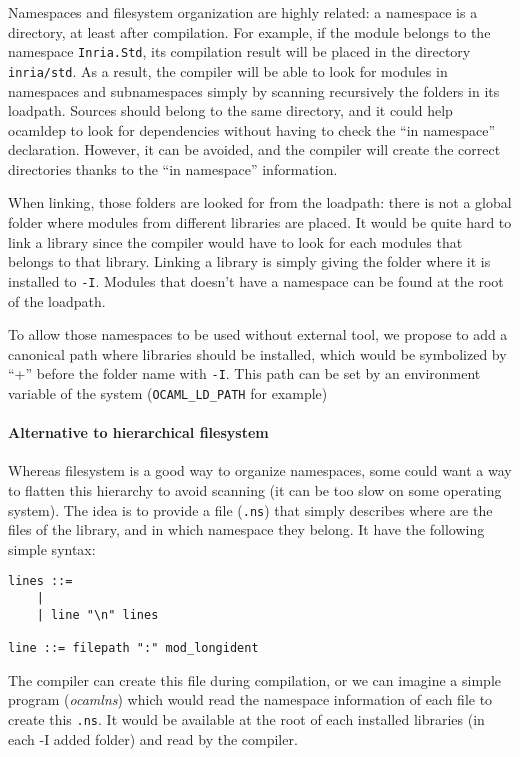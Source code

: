 \documentclass[11pt,a4paper]{article}
\begin{document}
Namespaces and filesystem organization are highly related: a namespace is a
directory, at least after compilation. For example, if the module belongs to the
namespace \texttt{Inria.Std}, its compilation result will be placed in the
directory \texttt{inria/std}. As a result, the compiler will be able to look for
modules in namespaces and subnamespaces simply by scanning recursively the
folders in its loadpath. Sources should belong to the same directory, and it
could help ocamldep to look for dependencies without having to check the ``in
namespace'' declaration. However, it can be avoided, and the compiler will
create the correct directories thanks to the ``in namespace'' information.

When linking, those folders are looked for from the loadpath: there is not a
global folder where modules from different libraries are placed. It would be
quite hard to link a library since the compiler would have to look for each
modules that belongs to that library. Linking a library is simply giving the
folder where it is installed to \texttt{-I}. Modules that doesn't have a
namespace can be found at the root of the loadpath.

To allow those namespaces to be used without external tool, we propose to add a
canonical path where libraries should be installed, which would be symbolized by
``+'' before the folder name with \texttt{-I}. This path can be set by an
environment variable of the system (\texttt{OCAML\_LD\_PATH} for example)

\paragraph{Alternative to hierarchical filesystem}

Whereas filesystem is a good way to organize namespaces, some could want a way
to flatten this hierarchy to avoid scanning (it can be too slow on some
operating system). The idea is to provide a file (\texttt{.ns}) that simply
describes where are the files of the library, and in which namespace they
belong. It have the following simple syntax:

\begin{verbatim}
lines ::=
    | 
    | line "\n" lines

line ::= filepath ":" mod_longident
\end{verbatim}

The compiler can create this file during compilation, or we can imagine a simple
program (\emph{ocamlns}) which would read the namespace information of each file
to create this \texttt{.ns}. It would be available at the root of each installed
libraries (in each -I added folder) and read by the compiler.
\end{document}
